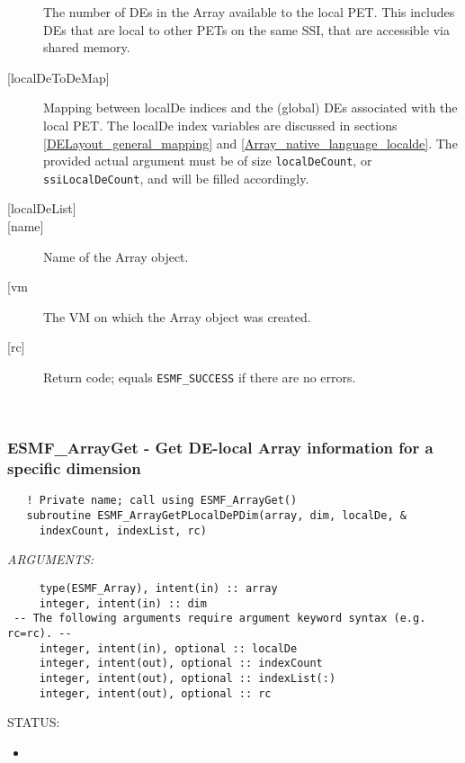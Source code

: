 \begin{description}
   The number of DEs in the Array available to the local PET. This
   includes DEs that are local to other PETs on the same SSI, that are
   accessible via shared memory.
   \item[{[localDeToDeMap]}]
   Mapping between localDe indices and the (global) DEs associated with
   the local PET. The localDe index variables are discussed in sections
   \ref{DELayout_general_mapping} and \ref{Array_native_language_localde}.
   The provided actual argument must be of size {\tt localDeCount}, or
   {\tt ssiLocalDeCount}, and will be filled accordingly.
   \item[{[localDeList]}]
   \item [{[name]}]
   Name of the Array object.
   \item [{[vm}]
   The VM on which the Array object was created.
   \item[{[rc]}]
   Return code; equals {\tt ESMF\_SUCCESS} if there are no errors.
   \end{description}
   
 
\mbox{}\hrulefill\ 
 
\subsubsection [ESMF\_ArrayGet] {ESMF\_ArrayGet - Get DE-local Array information for a specific dimension}


\begin{verbatim}   ! Private name; call using ESMF_ArrayGet()
   subroutine ESMF_ArrayGetPLocalDePDim(array, dim, localDe, &
     indexCount, indexList, rc)\end{verbatim}{\em ARGUMENTS:}
\begin{verbatim}     type(ESMF_Array), intent(in) :: array
     integer, intent(in) :: dim
 -- The following arguments require argument keyword syntax (e.g. rc=rc). --
     integer, intent(in), optional :: localDe
     integer, intent(out), optional :: indexCount
     integer, intent(out), optional :: indexList(:)
     integer, intent(out), optional :: rc\end{verbatim}
{\sf STATUS:}
   \begin{itemize}
   \item{}
   \end{itemize}
  
